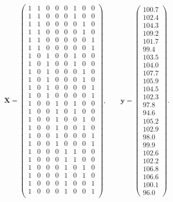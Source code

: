 \documentclass[letterpaper]{article}
\begin{document}
				\[
				\mathbf{X} =
				\begin{pmatrix}
					1 & 1 & 0 & 0 & 0 & 1 & 0 & 0 \\
					1 & 1 & 0 & 0 & 0 & 1 & 0 & 0 \\
					1 & 1 & 0 & 0 & 0 & 0 & 1 & 0 \\
					1 & 1 & 0 & 0 & 0 & 0 & 1 & 0 \\
					1 & 1 & 0 & 0 & 0 & 0 & 0 & 1 \\
					1 & 1 & 0 & 0 & 0 & 0 & 0 & 1 \\
					1 & 0 & 1 & 0 & 0 & 1 & 0 & 0 \\
					1 & 0 & 1 & 0 & 0 & 1 & 0 & 0 \\
					1 & 0 & 1 & 0 & 0 & 0 & 1 & 0 \\
					1 & 0 & 1 & 0 & 0 & 0 & 1 & 0 \\
					1 & 0 & 1 & 0 & 0 & 0 & 0 & 1 \\
					1 & 0 & 1 & 0 & 0 & 0 & 0 & 1 \\
					1 & 0 & 0 & 1 & 0 & 1 & 0 & 0 \\
					1 & 0 & 0 & 1 & 0 & 1 & 0 & 0 \\
					1 & 0 & 0 & 1 & 0 & 0 & 1 & 0 \\
					1 & 0 & 0 & 1 & 0 & 0 & 1 & 0 \\
					1 & 0 & 0 & 1 & 0 & 0 & 0 & 1 \\
					1 & 0 & 0 & 1 & 0 & 0 & 0 & 1 \\
					1 & 0 & 0 & 0 & 1 & 1 & 0 & 0 \\
					1 & 0 & 0 & 0 & 1 & 1 & 0 & 0 \\
					1 & 0 & 0 & 0 & 1 & 0 & 1 & 0 \\
					1 & 0 & 0 & 0 & 1 & 0 & 1 & 0 \\
					1 & 0 & 0 & 0 & 1 & 0 & 0 & 1 \\
					1 & 0 & 0 & 0 & 1 & 0 & 0 & 1 \\
				\end{pmatrix},
				\qquad
				\mathbf{y} =
				\begin{pmatrix}
					100.7\\102.4\\104.3\\109.2\\101.7\\99.4\\
					103.5\\104.0\\107.7\\105.9\\104.5\\102.3\\
					97.8\\94.6\\105.2\\102.9\\98.0\\99.9\\
					102.6\\102.2\\106.8\\106.6\\100.1\\96.0
				\end{pmatrix}.
				\]
				
\end{document}
